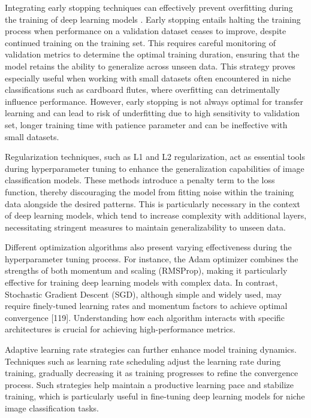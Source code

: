 Integrating early stopping techniques can effectively prevent overfitting during the training of deep learning models \cite{prechelt1998early}. Early stopping entails halting the training process when performance on a validation dataset ceases to improve, despite continued training on the training set. This requires careful monitoring of validation metrics to determine the optimal training duration, ensuring that the model retains the ability to generalize across unseen data. This strategy proves especially useful when working with small datasets often encountered in niche classifications such as cardboard flutes, where overfitting can detrimentally influence performance. However, early stopping is not always optimal for transfer learning and can lead to risk of underfitting due to high sensitivity to validation set, longer training time with patience parameter and can be ineffective with small datasets.


Regularization techniques, such as L1 and L2 regularization, act as essential tools during hyperparameter tuning to enhance the generalization capabilities of image classification models. These methods introduce a penalty term to the loss function, thereby discouraging the model from fitting noise within the training data alongside the desired patterns. This is particularly necessary in the context of deep learning models, which tend to increase complexity with additional layers, necessitating stringent measures to maintain generalizability to unseen data.


Different optimization algorithms also present varying effectiveness during the hyperparameter tuning process. For instance, the Adam optimizer combines the strengths of both momentum and scaling (RMSProp), making it particularly effective for training deep learning models with complex data. In contrast, Stochastic Gradient Descent (SGD), although simple and widely used, may require finely-tuned learning rates and momentum factors to achieve optimal convergence [119]\cite{ruder2016optimization}. Understanding how each algorithm interacts with specific architectures is crucial for achieving high-performance metrics.


Adaptive learning rate strategies can further enhance model training dynamics. Techniques such as learning rate scheduling adjust the learning rate during training, gradually decreasing it as training progresses to refine the convergence process. Such strategies help maintain a productive learning pace and stabilize training, which is particularly useful in fine-tuning deep learning models for niche image classification tasks.


